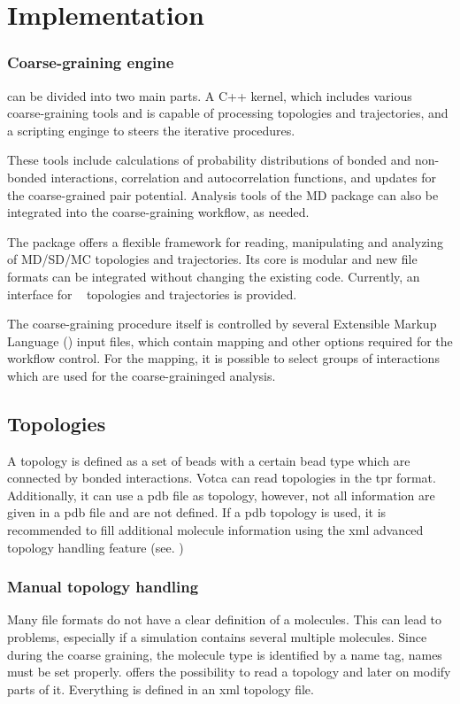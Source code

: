 \chapter{Implementation}
\subsection{Coarse-graining engine}
\votca can be divided into two main parts. A C++ kernel, which includes various coarse-graining tools and is capable of processing topologies and trajectories, and a scripting enginge to steers the iterative procedures.

These tools include calculations of probability distributions of bonded and non-bonded interactions, correlation and autocorrelation functions, and updates for the coarse-grained pair potential. Analysis tools of the MD package can also be integrated into the coarse-graining workflow, as needed.

The package offers a flexible framework for reading, manipulating and analyzing of MD/SD/MC topologies and trajectories. Its core is modular and new file formats can be integrated without changing the existing code. Currently, an interface for \gromacs~\cite{gromacs4} topologies and trajectories is provided.

The coarse-graining procedure itself is controlled by several Extensible Markup Language (\xml) input files, which contain mapping and other options required for the workflow control. For the mapping, it is possible to select groups of interactions which are used for the coarse-graininged analysis. 



\section{Topologies}
A topology is defined as a set of beads with a certain bead type which are connected by bonded interactions.
Votca can read topologies in the \gromacs tpr format. Additionally, it can use a pdb file as topology, however, not all information are given in a pdb file and are not defined. If a pdb topology is used, it is recommended to fill additional molecule information using the xml advanced topology handling feature (see. )
\subsection{Manual topology handling}
\label{sec:adv_topology}
Many file formats do not have a clear definition of a molecules. This can lead to problems, especially if a simulation contains several multiple molecules. Since during the coarse graining, the molecule type is identified by a name tag, names must be set properly. \votca offers the possibility to read a topology and later on modify parts of it. Everything is defined in an xml topology file.

